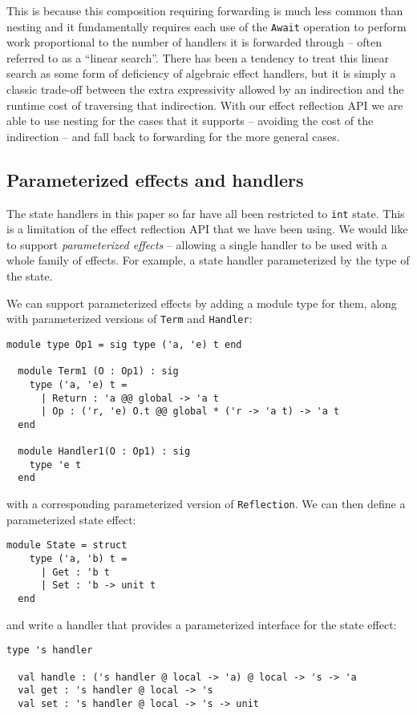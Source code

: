 \documentclass[acmsmall, screen, review, anonymous]{acmart}
\theoremstyle{definition}
\begin{document}
This is because this composition requiring forwarding is much less
common than nesting and it fundamentally requires each use of the
\lstinline[style=oxcaml]{Await} operation to perform work proportional to
the number of handlers it is forwarded through -- often referred to as a
``linear search''. There has been a tendency to treat this linear search
as some form of deficiency of algebraic effect handlers, but it is
simply a classic trade-off between the extra expressivity allowed by an
indirection and the runtime cost of traversing that indirection. With
our effect reflection API we are able to use nesting for the cases that
it supports -- avoiding the cost of the indirection -- and fall back to
forwarding for the more general cases.

\subsection{Parameterized effects and handlers}

The state handlers in this paper so far have all been restricted to
\lstinline[style=oxcaml]{int} state. This is a limitation of the effect
reflection API that we have been using. We would like to support
\emph{parameterized effects} -- allowing a single handler to be used
with a whole family of effects. For example, a state handler
parameterized by the type of the state.

We can support parameterized effects by adding a module type for them,
along with parameterized versions of \lstinline[style=oxcaml]{Term} and
\lstinline[style=oxcaml]{Handler}:
\begin{lstlisting}[style=oxcaml]
  module type Op1 = sig type ('a, 'e) t end

  module Term1 (O : Op1) : sig
    type ('a, 'e) t =
      | Return : 'a @@ global -> 'a t
      | Op : ('r, 'e) O.t @@ global * ('r -> 'a t) -> 'a t
  end

  module Handler1(O : Op1) : sig
    type 'e t
  end
\end{lstlisting}
with a corresponding parameterized version of
\lstinline[style=oxcaml]{Reflection}. We can then define a parameterized
state effect:
\begin{lstlisting}[style=oxcaml]
  module State = struct
    type ('a, 'b) t =
      | Get : 'b t
      | Set : 'b -> unit t
  end
\end{lstlisting}
and write a handler that provides a parameterized interface for the
state effect:
\begin{lstlisting}[style=oxcaml]
  type 's handler

  val handle : ('s handler @ local -> 'a) @ local -> 's -> 'a
  val get : 's handler @ local -> 's
  val set : 's handler @ local -> 's -> unit
\end{lstlisting}
\end{document}
